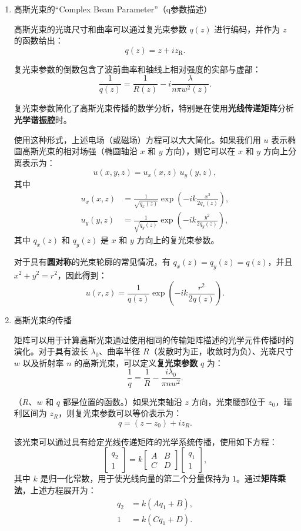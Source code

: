 \begin{enumerate}
\begin{enumerate}
		
		\item 高斯光束的“Complex Beam Parameter”（q参数描述）
		
		高斯光束的光斑尺寸和曲率可以通过复光束参数 $q(z)$ 进行编码，并作为 $z$ 的函数给出：
		\[
		q(z) = z + i z_\mathrm{R}.
		\]
		
		复光束参数的倒数包含了波前曲率和轴线上相对强度的实部与虚部：
		\[
		\frac{1}{q(z)} = \frac{1}{R(z)} - i \frac{\lambda}{n \pi w^2(z)}.
		\]
		
		复光束参数简化了高斯光束传播的数学分析，特别是在使用\textbf{光线传递矩阵}分析\textbf{光学谐振腔}时。
		
		使用这种形式，上述电场（或磁场）方程可以大大简化。如果我们用 $u$ 表示椭圆高斯光束的相对场强（椭圆轴沿 $x$ 和 $y$ 方向），则它可以在 $x$ 和 $y$ 方向上分离表示为：
		\[
		u(x, y, z) = u_x(x, z) \, u_y(y, z),
		\]
		其中
		\[
		\begin{aligned}
			u_x(x, z) &= \frac{1}{\sqrt{q_x(z)}} \exp\left(-i k \frac{x^2}{2 q_x(z)}\right), \\
			u_y(y, z) &= \frac{1}{\sqrt{q_y(z)}} \exp\left(-i k \frac{y^2}{2 q_y(z)}\right),
		\end{aligned}
		\]
		其中 $q_x(z)$ 和 $q_y(z)$ 是 $x$ 和 $y$ 方向上的复光束参数。
		
		对于具有\textbf{圆对称}的光束轮廓的常见情况，有 $q_x(z) = q_y(z) = q(z)$，并且 $x^2 + y^2 = r^2$，因此得到：
		\[
		u(r, z) = \frac{1}{q(z)} \exp\left( -i k \frac{r^2}{2 q(z)} \right).
		\]
		
		\item 高斯光束的传播
		
		矩阵可以用于计算高斯光束通过使用相同的传输矩阵描述的光学元件传播时的演化。对于具有波长 $\lambda_0$、曲率半径 $R$（发散时为正，收敛时为负）、光斑尺寸 $w$ 以及折射率 $n$ 的高斯光束，可以定义\textbf{复光束参数} $q$ 为：
		\[
		\frac{1}{q} = \frac{1}{R} - \frac{i \lambda_0}{\pi n w^2}.
		\]
		
		（$R$、$w$ 和 $q$ 都是位置的函数。）如果光束轴沿 $z$ 方向，光束腰部位于 $z_0$，瑞利区间为 $z_R$，则复光束参数可以等价表示为：
		\[
		q = (z - z_0) + i z_R.
		\]
		
		该光束可以通过具有给定光线传递矩阵的光学系统传播，使用如下方程：
		\[
		\begin{bmatrix}
			q_2 \\
			1
		\end{bmatrix}
		= k \begin{bmatrix}
			A & B \\
			C & D
		\end{bmatrix}
		\begin{bmatrix}
			q_1 \\
			1
		\end{bmatrix},
		\]
		其中 $k$ 是归一化常数，用于使光线向量的第二个分量保持为 $1$。通过\textbf{矩阵乘法}，上述方程展开为：
		\[
		\begin{aligned}
			q_2 &= k (A q_1 + B), \\
			1   &= k (C q_1 + D).
		\end{aligned}
		\]
		

\end{enumerate}
\end{enumerate}
